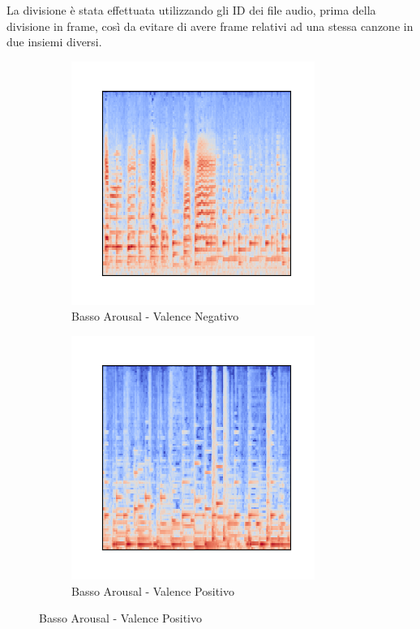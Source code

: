 \documentclass[11pt]{report}
\begin{document}
La divisione è stata effettuata utilizzando gli ID dei file audio, prima della divisione in frame, così da evitare di avere frame relativi ad una stessa canzone in due insiemi diversi. 

\newpage

\begin{figure}
\centering
	\begin{subfigure}[t]{.45\textwidth}
         \centering
         \includegraphics[scale = 0.8]{img/Mel-0.png}
         \caption{Basso Arousal - Valence Negativo}
	\end{subfigure}
	\quad
	\begin{subfigure}[t]{.45\textwidth}
		\centering
        \includegraphics[scale = 0.8]{img/Mel-1.png}
        \caption{Basso Arousal - Valence Positivo}
	\end{subfigure}
	

\end{figure}
\end{document}
